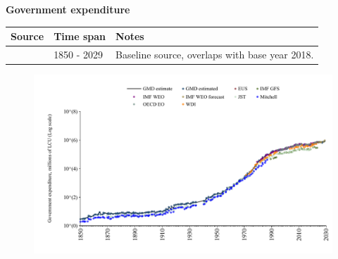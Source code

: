 \documentclass[12pt,a4paper,landscape]{article}
\begin{document}
\begin{adjustbox}{max totalsize={\paperwidth}{\paperheight},center}
\begin{minipage}[t][\textheight][t]{\textwidth}
\vspace*{0.5cm}
{}
\begin{center}
{\Large\bfseries Government expenditure}
\end{center}
\vspace{0.5cm}
\begin{table}[H]
\centering
\small
\begin{tabular}{|l|l|l|}
\hline
\textbf{Source} & \textbf{Time span} & \textbf{Notes} \\
\hline
\rowcolor{white}\cite{GMD_estimated}& 1850 - 2029 &Baseline source, overlaps with base year 2018. \\
\hline
\end{tabular}
\end{table}
\begin{figure}[H]
\centering
\includegraphics[width=\textwidth,height=0.6\textheight,keepaspectratio]{graphs/ESP_govexp.pdf}
\end{figure}
\end{minipage}
\end{adjustbox}
\end{document}
